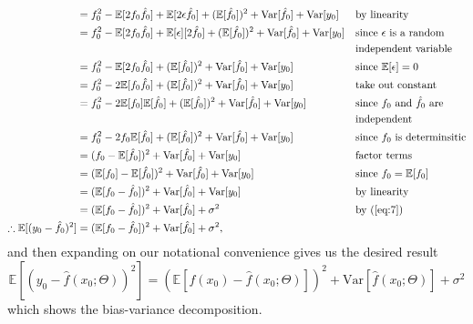 \documentclass [10pt]{article}
\begin{document}
\begin{enumerate}
\begin{enumerate}
\begin{align}
			&=f_{0}^{2}-\mathbb{E}[2f_{0}\hat{f}_{0}]+\mathbb{E}[2\epsilon\hat{f}_{0}]+(\mathbb{E}[\hat{f}_{0}])^{2}+\text{Var}[\hat{f}_{0}]+\text{Var}[y_{0}]&&\text{by linearity}\nonumber\\
			&=f_{0}^{2}-\mathbb{E}[2f_{0}\hat{f}_{0}]+\mathbb{E}[\epsilon][2\hat{f}_{0}]+(\mathbb{E}[\hat{f}_{0}])^{2}+\text{Var}[\hat{f}_{0}]+\text{Var}[y_{0}]&&\text{since $\epsilon$ is a random}\nonumber\\
			& &&\text{independent variable}\nonumber\\
			&=f_{0}^{2}-\mathbb{E}[2f_{0}\hat{f}_{0}]+(\mathbb{E}[\hat{f}_{0}])^{2}+\text{Var}[\hat{f}_{0}]+\text{Var}[y_{0}]&&\text{since $\mathbb{E}[\epsilon]=0$}\nonumber\\
			&=f_{0}^{2}-2\mathbb{E}[f_{0}\hat{f}_{0}]+(\mathbb{E}[\hat{f}_{0}])^{2}+\text{Var}[\hat{f}_{0}]+\text{Var}[y_{0}]&&\text{take out constant}\nonumber\\
			&=f_{0}^{2}-2\mathbb{E}[f_{0}]\mathbb{E}[\hat{f}_{0}]+(\mathbb{E}[\hat{f}_{0}])^{2}+\text{Var}[\hat{f}_{0}]+\text{Var}[y_{0}]&&\text{since $f_{0}$ and $\hat{f}_{0}$ are}\nonumber\\
			& &&\text{independent}\nonumber\\
			&=f_{0}^{2}-2f_{0}\mathbb{E}[\hat{f}_{0}]+(\mathbb{E}[\hat{f}_{0}])^{2}+\text{Var}[\hat{f}_{0}]+\text{Var}[y_{0}]&&\text{since $f_{0}$ is determinsitic}\nonumber\\
			&=(f_{0}-\mathbb{E}[\hat{f}_{0}])^{2}+\text{Var}[\hat{f}_{0}]+\text{Var}[y_{0}]&&\text{factor terms}\nonumber\\
			&=(\mathbb{E}[f_{0}]-\mathbb{E}[\hat{f}_{0}])^{2}+\text{Var}[\hat{f}_{0}]+\text{Var}[y_{0}]&&\text{since $f_{0}=\mathbb{E}[f_{0}]$}\nonumber\\
			&=(\mathbb{E}[f_{0}-\hat{f}_{0}])^{2}+\text{Var}[\hat{f}_{0}]+\text{Var}[y_{0}]&&\text{by linearity}\nonumber\\
			&=(\mathbb{E}[f_{0}-\hat{f}_{0}])^{2}+\text{Var}[\hat{f}_{0}]+\sigma^{2}&&\text{by (\ref{eq:7})}\nonumber\\
			\therefore\mathbb{E}[(y_{0}-\hat{f}_{0})^{2}]&=(\mathbb{E}[f_{0}-\hat{f}_{0}])^{2}+\text{Var}[\hat{f}_{0}]+\sigma^{2},\nonumber
		\end{align}
		and then expanding on our notational convenience gives us the desired result$$\mathbb{E}[(y_{0}-\hat{f}(x_{0};\Theta))^{2}]=(\mathbb{E}[f(x_{0})-\hat{f}(x_{0};\Theta)])^{2}+\text{Var}[\hat{f}(x_{0};\Theta)]+\sigma^{2}$$which shows the bias-variance decomposition.
	\end{enumerate}
\end{enumerate}
\end{document}
